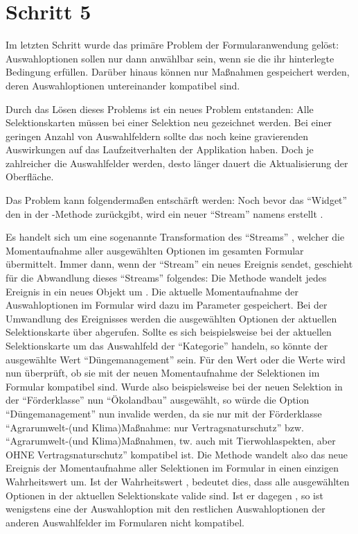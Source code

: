\chapter{Schritt 5}
\label{chap:Schritt-5}

Im letzten Schritt wurde das primäre Problem der Formularanwendung gelöst:
Auswahloptionen sollen nur dann anwählbar sein,
wenn sie die ihr hinterlegte Bedingung erfüllen.
Darüber hinaus können nur Maßnahmen gespeichert werden,
deren Auswahloptionen untereinander kompatibel sind.

Durch das Lösen dieses Problems ist ein neues Problem entstanden:
Alle Selektionskarten müssen bei einer Selektion neu gezeichnet werden.
Bei einer geringen Anzahl von Auswahlfeldern sollte das noch keine gravierenden Auswirkungen auf das Laufzeitverhalten der Applikation haben.
Doch je zahlreicher die Auswahlfelder werden,
desto länger dauert die Aktualisierung der Oberfläche.

Das Problem kann folgendermaßen entschärft werden:
Noch bevor das \enquote{Widget}  den  in der -Methode zurückgibt,
wird ein neuer \enquote{Stream} namens  erstellt .

Es handelt sich um eine sogenannte Transformation des \enquote{Streams} , welcher die Momentaufnahme aller ausgewählten Optionen im gesamten Formular übermittelt.
Immer dann, wenn der \enquote{Stream}  ein neues Ereignis sendet,
geschieht für die Abwandlung dieses \enquote{Streams} folgendes:
Die Methode  wandelt jedes Ereignis in ein neues Objekt um .
Die aktuelle Momentaufnahme der Auswahloptionen im Formular wird dazu im Parameter  gespeichert.
Bei der Umwandlung des Ereignisses werden die ausgewählten Optionen der aktuellen Selektionskarte über  abgerufen.
Sollte es sich beispielsweise bei der aktuellen Selektionskarte um das Auswahlfeld der \enquote{Kategorie} handeln,
so könnte der ausgewählte Wert \enquote{Düngemanagement} sein.
Für den Wert oder die Werte wird nun überprüft, ob sie mit der neuen Momentaufnahme der Selektionen im Formular kompatibel sind.
Wurde also beispielsweise bei der neuen Selektion in der \enquote{Förderklasse} nun \enquote{Ökolandbau} ausgewählt,
so würde die Option \enquote{Düngemanagement} nun invalide werden,
da sie nur mit der Förderklasse \enquote{Agrarumwelt-(und Klima)Maßnahme: nur Vertragsnaturschutz} bzw. \enquote{Agrarumwelt-(und Klima)Maßnahmen, tw. auch mit Tierwohlaspekten, aber OHNE Vertragsnaturschutz} kompatibel ist.
Die Methode  wandelt also das neue Ereignis der Momentaufnahme aller Selektionen im Formular in einen einzigen Wahrheitswert um.
Ist der Wahrheitswert ,
bedeutet dies,
dass alle ausgewählten Optionen in der aktuellen Selektionskate valide sind.
Ist er dagegen , so ist wenigstens eine der Auswahloption mit den restlichen Auswahloptionen der anderen Auswahlfelder im Formularen nicht kompatibel.

